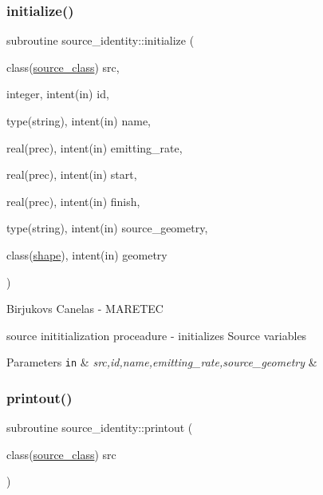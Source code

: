 \subsubsection{\texorpdfstring{initialize()}{initialize()}}
{\footnotesize\ttfamily subroutine source\+\_\+identity\+::initialize (\begin{DoxyParamCaption}\item[{class(\mbox{\hyperlink{structsource__identity_1_1source__class}{source\+\_\+class}})}]{src,  }\item[{integer, intent(in)}]{id,  }\item[{type(string), intent(in)}]{name,  }\item[{real(prec), intent(in)}]{emitting\+\_\+rate,  }\item[{real(prec), intent(in)}]{start,  }\item[{real(prec), intent(in)}]{finish,  }\item[{type(string), intent(in)}]{source\+\_\+geometry,  }\item[{class(\mbox{\hyperlink{structgeometry_1_1shape}{shape}}), intent(in)}]{geometry }\end{DoxyParamCaption})\hspace{0.3cm}{\ttfamily [private]}}



Birjukovs Canelas -\/ M\+A\+R\+E\+T\+EC 

source inititialization proceadure -\/ initializes Source variables 
\begin{DoxyParams}[1]{Parameters}
\mbox{\tt in}  & {\em src,id,name,emitting\+\_\+rate,source\+\_\+geometry} & \\
\hline
\end{DoxyParams}
\mbox{\label{namespacesource__identity_a9715a7d707b4c80aa2d2ebd08712f6a9}} 
\subsubsection{\texorpdfstring{printout()}{printout()}}
{\footnotesize\ttfamily subroutine source\+\_\+identity\+::printout (\begin{DoxyParamCaption}\item[{class(\mbox{\hyperlink{structsource__identity_1_1source__class}{source\+\_\+class}})}]{src }\end{DoxyParamCaption})\hspace{0.3cm}{\ttfamily [private]}}



